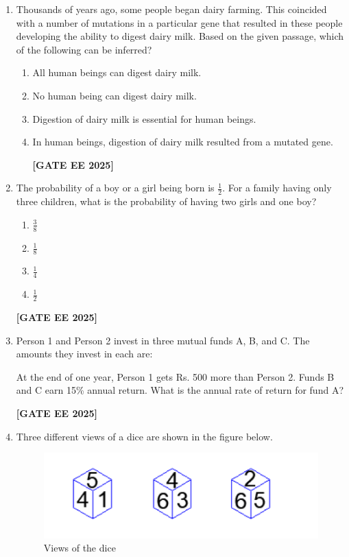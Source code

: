 \documentclass[journal]{IEEEtran}
\newcommand{\qfooter}{%
  \begin{flushright}\footnotesize\textbf{[GATE EE 2025]}\end{flushright}\vspace{1em}%
}
\begin{document}
\begin{enumerate}
\item Thousands of years ago, some people began dairy farming. This coincided with a  
number of mutations in a particular gene that resulted in these people developing the ability to digest dairy milk.  
Based on the given passage, which of the following can be inferred?
\begin{enumerate}
\item All human beings can digest dairy milk.
\item No human being can digest dairy milk.
\item Digestion of dairy milk is essential for human beings.
\item In human beings, digestion of dairy milk resulted from a mutated gene.
\qfooter
\end{enumerate}
\item The probability of a boy or a girl being born is $\frac{1}{2}$. For a family having only three children, what is the probability of having two girls and one boy?
\begin{multicols}{4}
\begin{enumerate}
\item $\frac{3}{8}$
\item $\frac{1}{8}$
\item $\frac{1}{4}$
\item $\frac{1}{2}$
\end{enumerate} 
\qfooter
\end{multicols}

\item Person 1 and Person 2 invest in three mutual funds A, B, and C. The amounts they invest in each are:

At the end of one year, Person 1 gets Rs. 500 more than Person 2. Funds B and C earn 15\% annual return.  
What is the annual rate of return for fund A?
\begin{enumerate}
\qfooter
\end{enumerate}
 
\item Three different views of a dice are shown in the figure below.

\begin{figure}[h]
\centering
\includegraphics[width=0.42\columnwidth]{figs/q9.png} %
\caption*{Views of the dice}
\label{fig:q9}
\end{figure}


\end{enumerate}
\end{document}
